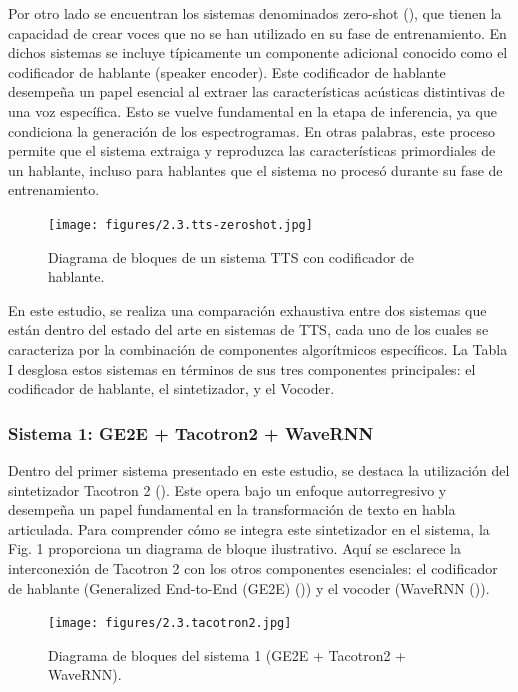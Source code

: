 Por otro lado se encuentran los sistemas denominados zero-shot (\cite{nvidia2023}), que tienen la capacidad de crear voces que no se han utilizado en su fase de entrenamiento. En dichos sistemas se incluye típicamente un componente adicional conocido como el codificador de hablante (speaker encoder). Este codificador de hablante desempeña un papel esencial al extraer las características acústicas distintivas de una voz específica. Esto se vuelve fundamental en la etapa de inferencia, ya que condiciona la generación de los espectrogramas. En otras palabras, este proceso permite que el sistema extraiga y reproduzca las características primordiales de un hablante, incluso para hablantes que el sistema no procesó durante su fase de entrenamiento.

\begin{figure}[h]
    \centering
    \texttt{[image: figures/2.3.tts-zeroshot.jpg]}
    \caption{Diagrama de bloques de un sistema TTS con codificador de hablante.}
    \label{fig:2.3.TTS zeros-hot}
\end{figure}

En este estudio, se realiza una comparación exhaustiva entre dos sistemas que están dentro del estado del arte en sistemas de TTS, cada uno de los cuales se caracteriza por la combinación de componentes algorítmicos específicos. La Tabla I desglosa estos sistemas en términos de sus tres componentes principales: el codificador de hablante, el sintetizador, y el Vocoder.

\subsubsection{Sistema 1: GE2E + Tacotron2 + WaveRNN}

Dentro del primer sistema presentado en este estudio, se destaca la utilización del sintetizador Tacotron 2 (\cite{shen2018}). Este opera bajo un enfoque autorregresivo y desempeña un papel fundamental en la transformación de texto en habla articulada. Para comprender cómo se integra este sintetizador en el sistema, la Fig. 1 proporciona un diagrama de bloque ilustrativo. Aquí se esclarece la interconexión de Tacotron 2 con los otros componentes esenciales: el codificador de hablante (Generalized End-to-End (GE2E) (\cite{wan2018})) y el vocoder (WaveRNN (\cite{kalchbrenner2018})).

\begin{figure}[h]
    \centering
    \texttt{[image: figures/2.3.tacotron2.jpg]}
    \caption{Diagrama de bloques del sistema 1 (GE2E + Tacotron2 + WaveRNN).}
    \label{fig:2.3.tacotron2}
\end{figure}

